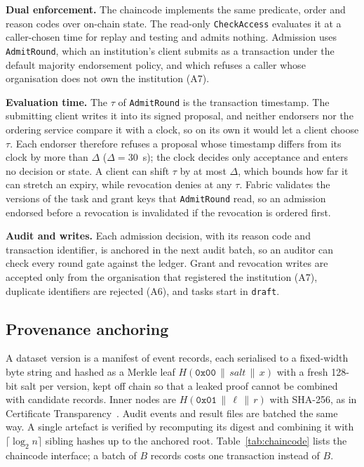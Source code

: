 \documentclass[pdflatex,iicol,sn-mathphys-num]{sn-jnl}
\theoremstyle{thmstyleone}
\newcommand{\TsTolerance}{30}
\begin{document}
\textbf{Dual enforcement.} The chaincode implements the same predicate, order and reason codes over on-chain state. The read-only \texttt{CheckAccess} evaluates it at a caller-chosen time for replay and testing and admits nothing. Admission uses \texttt{AdmitRound}, which an institution's client submits as a transaction under the default majority endorsement policy, and which refuses a caller whose organisation does not own the institution (A7).

\textbf{Evaluation time.} The $\tau$ of \texttt{AdmitRound} is the transaction timestamp. The submitting client writes it into its signed proposal, and neither endorsers nor the ordering service compare it with a clock, so on its own it would let a client choose $\tau$. Each endorser therefore refuses a proposal whose timestamp differs from its clock by more than $\Delta$ ($\Delta=\TsTolerance$~s); the clock decides only acceptance and enters no decision or state. A client can shift $\tau$ by at most $\Delta$, which bounds how far it can stretch an expiry, while revocation denies at any $\tau$. Fabric validates the versions of the task and grant keys that \texttt{AdmitRound} read, so an admission endorsed before a revocation is invalidated if the revocation is ordered first.

\textbf{Audit and writes.} Each admission decision, with its reason code and transaction identifier, is anchored in the next audit batch, so an auditor can check every round gate against the ledger. Grant and revocation writes are accepted only from the organisation that registered the institution (A7), duplicate identifiers are rejected (A6), and tasks start in \texttt{draft}.

\subsection{Provenance anchoring}\label{sec:anchoring}
A dataset version is a manifest of event records, each serialised to a fixed-width byte string and hashed as a Merkle leaf $H(\texttt{0x00}\,\|\,\textit{salt}\,\|\,x)$ with a fresh 128-bit salt per version, kept off chain so that a leaked proof cannot be combined with candidate records. Inner nodes are $H(\texttt{0x01}\,\|\,\ell\,\|\,r)$ with SHA-256, as in Certificate Transparency~\cite{laurie2013certificate}. Audit events and result files are batched the same way. A single artefact is verified by recomputing its digest and combining it with $\lceil\log_2 n\rceil$ sibling hashes up to the anchored root. Table~\ref{tab:chaincode} lists the chaincode interface; a batch of $B$ records costs one transaction instead of $B$.
\end{document}
